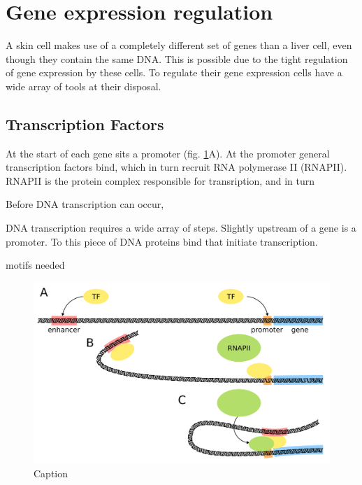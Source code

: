 
\section{Gene expression regulation}

A skin cell makes use of a completely different set of genes than a liver cell, even though they contain the same DNA. This is possible due to the tight regulation of gene expression by these cells. To regulate their gene expression cells have a wide array of tools at their disposal. 

\subsection{Transcription Factors}

At the start of each gene sits a promoter (fig. \ref{fig:TF}A). At the promoter general transcription factors bind, which in turn recruit RNA polymerase II (RNAPII). RNAPII is the protein complex responsible for transription, and in turn 

Before DNA transcription can occur, 

DNA transcription requires a wide array of steps. Slightly upstream of a gene is a promoter. To this piece of DNA proteins bind that initiate transcription.

motifs needed

\begin{figure}[H]
    \includegraphics[width=\linewidth]{ch.introduction/imgs/transcription_factor.png}
    \caption{Caption}
    \label{fig:TF}
\end{figure}

